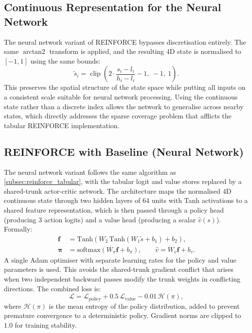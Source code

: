 
\subsection{Continuous Representation for the Neural Network}

The neural network variant of REINFORCE bypasses discretisation entirely. The same $\operatorname{arctan2}$ transform is applied, and the resulting 4D state is normalised to $[-1, 1]$ using the same bounds:
\begin{equation}
    \tilde{s}_i = \operatorname{clip}\!\left(
        2 \cdot \frac{s_i - l_i}{h_i - l_i} - 1,\ -1,\ 1
    \right).
\end{equation}
This preserves the spatial structure of the state space while putting all inputs on a consistent scale suitable for neural network processing. Using the continuous state rather than a discrete index allows the network to
generalise across nearby states, which directly addresses the sparse coverage problem that afflicts the tabular REINFORCE implementation.

\subsection{REINFORCE with Baseline (Neural Network)}
\label{subsec:reinforce_nn}

The neural network variant follows the same algorithm as \cref{subsec:reinforce_tabular}, with the tabular logit and value stores replaced by a shared-trunk actor-critic network. The architecture maps the normalised 4D continuous state through two hidden layers of 64 units with Tanh activations to a shared feature representation, which is then passed through a policy head (producing 3 action logits) and a value head (producing a scalar $\hat{v}(s)$). Formally:
\begin{align}
    \mathbf{f} &= \text{Tanh}(W_2\,\text{Tanh}(W_1 \tilde{s} + b_1) + b_2), \\
    \boldsymbol{\pi} &= \text{softmax}(W_\pi \mathbf{f} + b_\pi), \qquad
    \hat{v} = W_v \mathbf{f} + b_v.
\end{align}
A single Adam optimiser with separate learning rates for the policy and value parameters is used. This avoids the shared-trunk gradient conflict that arises when two independent backward passes modify the trunk weights in conflicting directions. The combined loss is:
\begin{equation}
    \mathcal{L} = \mathcal{L}_\text{policy}
    + 0.5\,\mathcal{L}_\text{value}
    - 0.01\,\mathcal{H}(\pi),
\end{equation}
where $\mathcal{H}(\pi)$ is the mean entropy of the policy distribution, added to prevent premature convergence to a deterministic policy. Gradient norms are clipped to $1.0$ for training stability.


